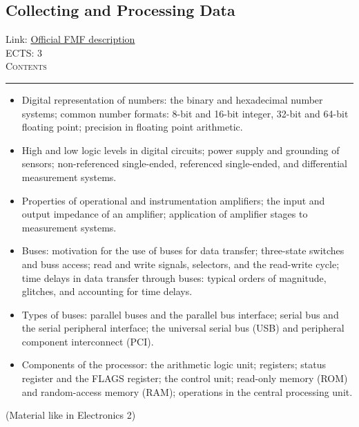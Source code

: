 \documentclass[11pt, a4paper]{article}
\newenvironment{course}[3]{
\subsection{#1}%
Link: \href{#2}{Official FMF description}\\%
ECTS: #3%
\vspace{1ex}
\\
{\large \textsc{Contents}}\\[-0.9ex]%
\rule{\textwidth}{0.5pt}
\vspace{-3ex}
}
{}
\newenvironment{chapter}[1]{
\begin{tcolorbox}[title=#1, breakable]
}
{\end{tcolorbox}}
\begin{document}
\begin{course}{Collecting and Processing Data}{https://www.fmf.uni-lj.si/en/study-physics/programmes/1fiz/2020/7000777/courses/1178/}{3}
    \label{collecting_and_processing_data}

    \begin{chapter}{Model of the processor}
        \begin{itemize}
        
            \item Digital representation of numbers: the binary and hexadecimal number systems; common number formats: 8-bit and 16-bit integer, 32-bit and 64-bit floating point; precision in floating point arithmetic.

            \item High and low logic levels in digital circuits; power supply and grounding of sensors;
            non-referenced single-ended, referenced single-ended, and differential measurement systems.

            \item Properties of operational and instrumentation amplifiers; the input and output impedance of an amplifier; application of amplifier stages to measurement systems.

            \item Buses: motivation for the use of buses for data transfer; three-state switches and buss access; read and write signals, selectors, and the read-write cycle; time delays in data transfer through buses: typical orders of magnitude, glitches, and accounting for time delays.

            \item Types of buses: parallel buses and the parallel bus interface; serial bus and the serial peripheral interface; the universal serial bus (USB) and peripheral component interconnect (PCI).

            \item Components of the processor: the arithmetic logic unit; registers; status register and the FLAGS register; the control unit; read-only memory (ROM) and random-access memory (RAM); operations in the central processing unit.

        \end{itemize}
    \end{chapter}

    \begin{chapter}{Analog-digital conversion}
        (Material like in Electronics 2)
        \begin{itemize}
        

\end{itemize}
\end{chapter}
\end{course}
\end{document}
